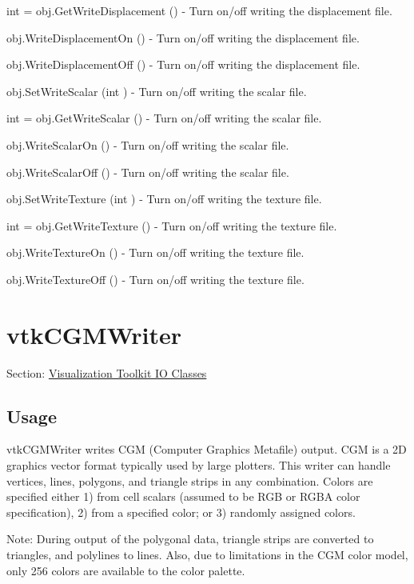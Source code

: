 \begin{DoxyItemize}
\item {\ttfamily int = obj.\-Get\-Write\-Displacement ()} -\/ Turn on/off writing the displacement file.  
\item {\ttfamily obj.\-Write\-Displacement\-On ()} -\/ Turn on/off writing the displacement file.  
\item {\ttfamily obj.\-Write\-Displacement\-Off ()} -\/ Turn on/off writing the displacement file.  
\item {\ttfamily obj.\-Set\-Write\-Scalar (int )} -\/ Turn on/off writing the scalar file.  
\item {\ttfamily int = obj.\-Get\-Write\-Scalar ()} -\/ Turn on/off writing the scalar file.  
\item {\ttfamily obj.\-Write\-Scalar\-On ()} -\/ Turn on/off writing the scalar file.  
\item {\ttfamily obj.\-Write\-Scalar\-Off ()} -\/ Turn on/off writing the scalar file.  
\item {\ttfamily obj.\-Set\-Write\-Texture (int )} -\/ Turn on/off writing the texture file.  
\item {\ttfamily int = obj.\-Get\-Write\-Texture ()} -\/ Turn on/off writing the texture file.  
\item {\ttfamily obj.\-Write\-Texture\-On ()} -\/ Turn on/off writing the texture file.  
\item {\ttfamily obj.\-Write\-Texture\-Off ()} -\/ Turn on/off writing the texture file.  
\end{DoxyItemize}\hypertarget{vtkio_vtkcgmwriter}{}\section{vtk\-C\-G\-M\-Writer}\label{vtkio_vtkcgmwriter}
Section\-: \hyperlink{sec_vtkio}{Visualization Toolkit I\-O Classes} \hypertarget{vtkwidgets_vtkxyplotwidget_Usage}{}\subsection{Usage}\label{vtkwidgets_vtkxyplotwidget_Usage}
vtk\-C\-G\-M\-Writer writes C\-G\-M (Computer Graphics Metafile) output. C\-G\-M is a 2\-D graphics vector format typically used by large plotters. This writer can handle vertices, lines, polygons, and triangle strips in any combination. Colors are specified either 1) from cell scalars (assumed to be R\-G\-B or R\-G\-B\-A color specification), 2) from a specified color; or 3) randomly assigned colors.

Note\-: During output of the polygonal data, triangle strips are converted to triangles, and polylines to lines. Also, due to limitations in the C\-G\-M color model, only 256 colors are available to the color palette.

